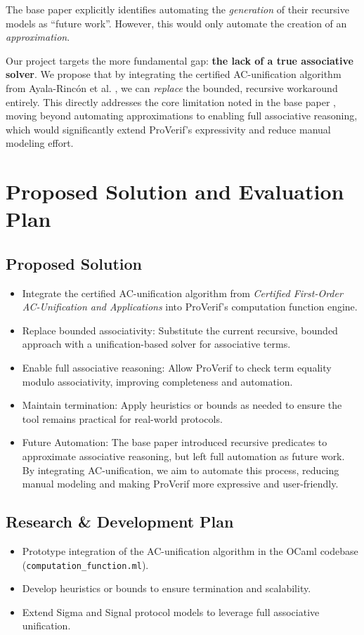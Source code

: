 \documentclass[journal]{IEEEtran}
\begin{document}
The base paper \cite{cheval2023hash} explicitly identifies automating the \emph{generation} of their recursive models as ``future work''. However, this would only automate the creation of an \emph{approximation}.

Our project targets the more fundamental gap: \textbf{the lack of a true associative solver}. We propose that by integrating the certified AC-unification algorithm from Ayala-Rincón et al. \cite{ayala2024certified}, we can \emph{replace} the bounded, recursive workaround entirely. This directly addresses the core limitation noted in the base paper \cite{cheval2023hash}, moving beyond automating approximations to enabling full associative reasoning, which would significantly extend ProVerif’s expressivity and reduce manual modeling effort.

\section{Proposed Solution and Evaluation Plan
}

\subsection{Proposed Solution}
\begin{itemize}
    \item Integrate the certified AC-unification algorithm from \textit{Certified First-Order AC-Unification and Applications} \cite{ayala2024certified} into ProVerif’s computation function engine.
    \item Replace bounded associativity: Substitute the current recursive, bounded approach with a unification-based solver for associative terms.
    \item Enable full associative reasoning: Allow ProVerif to check term equality modulo associativity, improving completeness and automation.
    \item Maintain termination: Apply heuristics or bounds as needed to ensure the tool remains practical for real-world protocols.
    \item Future Automation: The base paper introduced recursive predicates to approximate associative reasoning, but left full automation as future work. By integrating AC-unification, we aim to automate this process, reducing manual modeling and making ProVerif more expressive and user-friendly.
\end{itemize}

\subsection{Research \& Development Plan}
\begin{itemize}
    \item Prototype integration of the AC-unification algorithm in the OCaml codebase (\texttt{computation\_function.ml}).
    \item Develop heuristics or bounds to ensure termination and scalability.
    \item Extend Sigma and Signal protocol models \cite{cheval2023hash} to leverage full associative unification.
\end{itemize}
\end{document}
